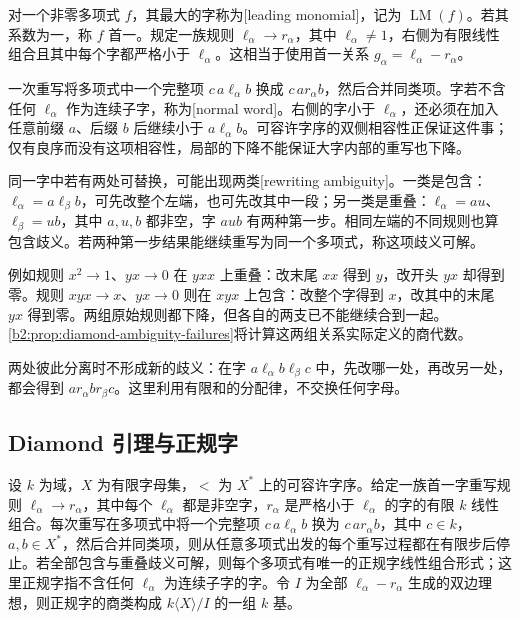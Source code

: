 对一个非零多项式 \(f\)，其最大的字称为[leading monomial]，记为 \(\operatorname{LM}(f)\)。若其系数为一，称 \(f\) 首一。规定一族规则 \(\ell_\alpha\to r_\alpha\)，其中 \(\ell_\alpha\ne1\)，右侧为有限线性组合且其中每个字都严格小于 \(\ell_\alpha\)。这相当于使用首一关系 \(g_\alpha=\ell_\alpha-r_\alpha\)。

\ProseParagraphBreak
一次重写将多项式中一个完整项 \(c\,a\ell_\alpha b\) 换成 \(c\,ar_\alpha b\)，然后合并同类项。字若不含任何 \(\ell_\alpha\) 作为连续子字，称为[normal word]。右侧的字小于 \(\ell_\alpha\)，还必须在加入任意前缀 \(a\)、后缀 \(b\) 后继续小于 \(a\ell_\alpha b\)。可容许字序的双侧相容性正保证这件事；仅有良序而没有这项相容性，局部的下降不能保证大字内部的重写也下降。

\ProseParagraphBreak
同一字中若有两处可替换，可能出现两类[rewriting ambiguity]。一类是包含：\(\ell_\alpha=a\ell_\beta b\)，可先改整个左端，也可先改其中一段；另一类是重叠：\(\ell_\alpha=au\)、\(\ell_\beta=ub\)，其中 \(a,u,b\) 都非空，字 \(aub\) 有两种第一步。相同左端的不同规则也算包含歧义。若两种第一步结果能继续重写为同一个多项式，称这项歧义可解。

\ProseParagraphBreak
例如规则 \(x^2\to1\)、\(yx\to0\) 在 \(yxx\) 上重叠：改末尾 \(xx\) 得到 \(y\)，改开头 \(yx\) 却得到零。规则 \(xyx\to x\)、\(yx\to0\) 则在 \(xyx\) 上包含：改整个字得到 \(x\)，改其中的末尾 \(yx\) 得到零。两组原始规则都下降，但各自的两支已不能继续合到一起。\cref{b2:prop:diamond-ambiguity-failures}将计算这两组关系实际定义的商代数。

\ProseParagraphBreak
两处彼此分离时不形成新的歧义：在字 \(a\ell_\alpha b\ell_\beta c\) 中，先改哪一处，再改另一处，都会得到 \(ar_\alpha br_\beta c\)。这里利用有限和的分配律，不交换任何字母。

\subsection{Diamond 引理与正规字}
\label{b2:subsec:2006:02}

\begin{theorem}\label{b2:thm:diamond-lemma}
	设 \(k\) 为域，\(X\) 为有限字母集，\(<\) 为 \(X^*\) 上的可容许字序。给定一族首一字重写规则 \(\ell_\alpha\rightarrow r_\alpha\)，其中每个 \(\ell_\alpha\) 都是非空字，\(r_\alpha\) 是严格小于 \(\ell_\alpha\) 的字的有限 \(k\) 线性组合。每次重写在多项式中将一个完整项 \(c\,a\ell_\alpha b\) 换为 \(c\,ar_\alpha b\)，其中 \(c\in k\)，\(a,b\in X^*\)，然后合并同类项，则从任意多项式出发的每个重写过程都在有限步后停止。若全部包含与重叠歧义可解，则每个多项式有唯一的正规字线性组合形式；这里正规字指不含任何 \(\ell_\alpha\) 为连续子字的字。令 \(I\) 为全部 \(\ell_\alpha-r_\alpha\) 生成的双边理想，则正规字的商类构成 \(k\langle X\rangle/I\) 的一组 \(k\) 基。
\end{theorem}

